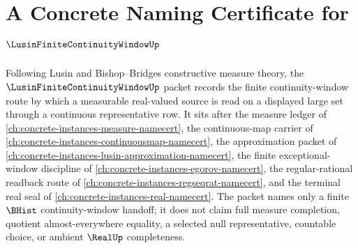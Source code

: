 \chapter{A Concrete Naming Certificate for $\LusinFiniteContinuityWindowUp$}
\label{ch:concrete-instances-lusin-finite-continuity-window-namecert}

Following Lusin and Bishop--Bridges constructive measure theory, the $\LusinFiniteContinuityWindowUp$ packet records the finite continuity-window route by which a measurable real-valued source is read on a displayed large set through a continuous representative row. It sits after the measure ledger of \autoref{ch:concrete-instances-measure-namecert}, the continuous-map carrier of \autoref{ch:concrete-instances-continuousmap-namecert}, the approximation packet of \autoref{ch:concrete-instances-lusin-approximation-namecert}, the finite exceptional-window discipline of \autoref{ch:concrete-instances-egorov-namecert}, the regular-rational readback route of \autoref{ch:concrete-instances-regseqrat-namecert}, and the terminal real seal of \autoref{ch:concrete-instances-real-namecert}. The packet names only a finite $\BHist$ continuity-window handoff; it does not claim full measure completion, quotient almost-everywhere equality, a selected null representative, countable choice, or ambient $\RealUp$ completeness.

